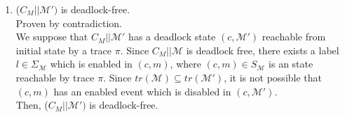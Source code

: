 \begin{enumerate}
\begin{enumerate}
         Proven by contradiction. \\
        Suppose $C_M$ is not legal for $\mathcal{M'}$ with respect to $\Sigma_u \cup (\mu \cup \mu')$. Then, $\exists \pi \in tr(C_M)$ such that $\exists l \in (\Sigma_u \cup (\mu \cup \mu')) \wedge \pi l \in tr(\mathcal{M'}) \wedge \pi l \notin tr(C_M)$. \\
        I separate into two cases: $l \in \Sigma_u \cup \mu$ or $l \in \mu'$
        \begin{enumerate}
            \item $l \in \Sigma_u \cup \mu$ \\
            This is not possible since $C_M$ is legal for $\mathcal{M}$ with respect to $\Sigma_u \cup \mu$ and $tr(\mathcal{M}) \subseteq tr(\mathcal{M'})$.
            \item $l \in \mu'$ \\
            By Lemma \ref{lemma:traces-inclusion}, if $\pi l \notin P_{M_{safe}}(tr(C_M))$, then $\pi l \notin tr(M_{safe})$. \\
            Then, by construction, $\pi \notin tr(M_1).$ \\
            Then, because $tr(\mathcal{M}) \subseteq tr(\mathcal{M'})$, $\pi l \notin tr(\mathcal{M'}).$ \\
            Which enter in contradiction with original assumption. Then, $C_M$ is legal for $\mathcal{M'}$ with respect to $\Sigma_u \cup (\mu \cup \mu')$.
        \end{enumerate}
        
        
        
        
        



        

        \item ($C_M || \mathcal{M'})$ is deadlock-free. \\
        Proven by contradiction. \\ 
        We suppose that $C_M || \mathcal{M'}$ has a deadlock state $(c, \mathcal{M'})$ reachable from initial state by a trace $\pi$. 
        Since $C_M || \mathcal{M}$ is deadlock free, there exists a label $l \in \Sigma_\mathcal{M}$ which is enabled in $(c, m)$, where $(c,m) \in S_\mathcal{M}$ is an state reachable by trace $\pi$.  
        Since $tr(\mathcal{M}) \subseteq tr(\mathcal{M'})$, it is not possible that $(c, m)$ has an enabled event which is disabled in $(c, \mathcal{M'})$. \\
        Then, ($C_M || \mathcal{M'})$ is deadlock-free.
        

\end{enumerate}
\end{enumerate}
